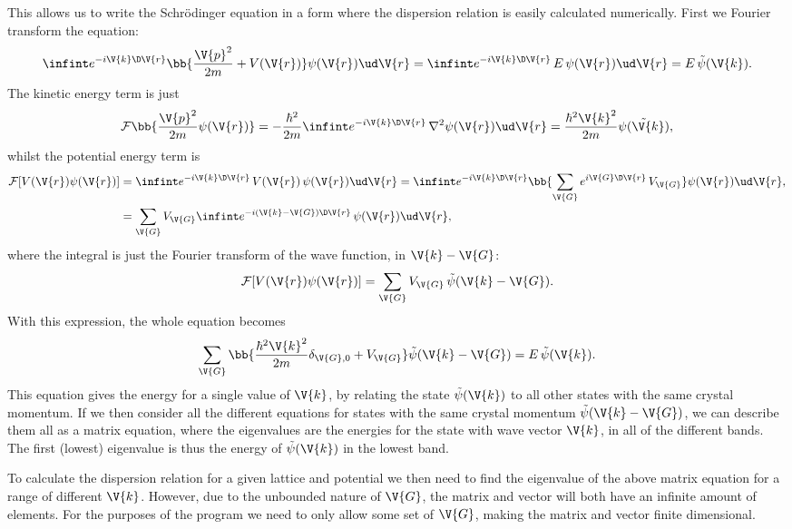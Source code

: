 \documentclass[main.tex]{subfiles}
\begin{document}
	This allows us to write the Schrödinger equation in a form where the dispersion relation is easily calculated numerically. First we Fourier transform the equation:
	\begin{equation}
		\infint e^{-i \V{k} \D \V{r}} \bb{\frac{\V{p}^2}{2m} + V(\V{r})}\psi(\V{r}) \ud \V{r}= \infint e^{-i\V{k} \D \V{r}}\, E\, \psi(\V{r}) \ud \V{r} = E \,\tilde{\psi}(\V{k}).
	\end{equation}
	The kinetic energy term is just
	\begin{equation}
		\mathcal{F}\bb{\frac{\V{p}^2}{2m} \psi(\V{r})} = -\frac{\hbar^2}{2m}\infint e^{-i \V{k} \D \V{r}}\, \nabla^2\psi(\V{r}) \ud \V{r} = \frac{\hbar^2 \V{k}^2}{2m}\tilde{\psi(\V{k})},
	\end{equation}
	whilst the potential energy term is
	\begin{align}
		\mathcal{F}[V(\V{r}) \psi(\V{r})] &= \infint e^{-i \V{k} \D \V{r}}\, V(\V{r})\, \psi(\V{r}) \ud \V{r} = \infint e^{-i \V{k}\D \V{r}} \bb{\sum_{\V{G}} e^{i \V{G} \D \V{r}}\, V_{\V{G}} }\psi (\V{r}) \ud \V{r}, \\
		&= \sum_{\V{G}} V_{\V{G}} \infint e^{-i(\V{k}-\V{G})\D \V{r}}\, \psi(\V{r}) \ud \V{r},
	\end{align}
	where the integral is just the Fourier transform of the wave function, in $ \V{k}-\V{G} $:
	\begin{equation}
		\mathcal{F}[V(\V{r}) \psi(\V{r})] = \sum_{\V{G}} V_{\V{G}} \, \tilde{\psi}(\V{k}-\V{G}).
	\end{equation}
	With this expression, the whole equation becomes
	\begin{equation}
		\sum_{\V{G}} \bb{\frac{\hbar^2 \V{k}^2}{2m} \delta_{\V{G},0} + V_{\V{G}} } \tilde{\psi}(\V{k}-\V{G}) = E\, \tilde{\psi}(\V{k}).
	\end{equation}
	This equation gives the energy for a single value of $ \V{k} $, by relating the state $ \tilde{\psi}(\V{k}) $ to all other states with the same crystal momentum. If we then consider all the different equations for states with the same crystal momentum $ \tilde{\psi} (\V{k}-\V{G}) $, we can describe them all as a matrix equation, where the eigenvalues are the energies for the state with wave vector $ \V{k} $, in all of the different bands. The first (lowest) eigenvalue is thus the energy of $ \tilde{\psi} (\V{k}) $ in the lowest band.
	
	To calculate the dispersion relation for a given lattice and potential we then need to find the eigenvalue of the above matrix equation for a range of different $ \V{k} $. However, due to the unbounded nature of $ \V{G} $, the matrix and vector will both have an infinite amount of elements. For the purposes of the program we need to only allow some set of $ \V{G} $, making the matrix and vector finite dimensional.
	
\end{document}
